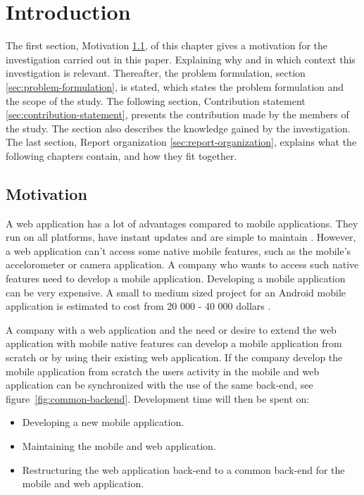 \chapter{Introduction}\label{ch:introduction}
The first section, Motivation \ref{sec:motivation}, of this chapter gives a motivation for the investigation carried out in this paper. Explaining why and in which context this investigation is relevant. Thereafter, the problem formulation, section \ref{sec:problem-formulation}, is stated, which states the problem formulation and the scope of the study. The following section, Contribution statement \ref{sec:contribution-statement}, presents the contribution made by the members of the study. The section also describes the knowledge gained by the investigation. The last section, Report organization \ref{sec:report-organization}, explains what the following chapters contain, and how they fit together.

\section{Motivation}\label{sec:motivation}
A web application has a lot of advantages compared to mobile applications. They run on all platforms, have instant updates and are simple to maintain \cite{michaels2013}. However, a web application can't access some native mobile features, such as the mobile's accelorometer or camera application. A company who wants to access such native features need to develop a mobile application. Developing a mobile application can be very expensive. A small to medium sized project for an Android mobile application is estimated to cost from 20 000 - 40 000 dollars \cite{kohan2015}.

A company with a web application and the need or desire to extend the web application with mobile native features can develop a mobile application from scratch or by using their existing web application. If the company develop the mobile application from scratch the users activity in the mobile and web application can be synchronized with the use of the same back-end, see figure~\ref{fig:common-backend}. Development time will then be spent on: 
\begin{itemize}
\item Developing a new mobile application.
\item Maintaining the mobile and web application.
\item Restructuring the web application back-end to a common back-end for the mobile and web application.
\end{itemize}

